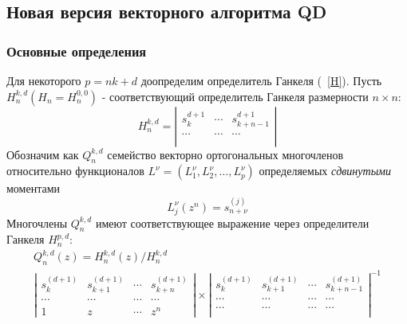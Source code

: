 \subsection{Новая версия векторного алгоритма QD}
\subsubsection{Основные определения}
Для некоторого $p=nk+d$ доопределим  определитель Ганкеля
(~\ref{H}). Пусть $H_n^{k,d} (H_n=H_n^{0,0}) $ - соответствующий
определитель Ганкеля размерности $n \times n$:
$$%
H_n^{k,d}= \left|
\begin{array}{cccccccccccccccccccccc}
s_k^{d+1} & \cdots & s_{k+n-1}^{d+1} \\
\cdots & \cdots & \cdots \\
\end{array}
\right|
$$%
Обозначим как $Q_n^{k,d}$ семейство векторно ортогональных
многочленов относительно функционалов
$L^{\nu}=(L_1^{\nu},L_2^{\nu},\ldots,L_p^{\nu})$ определяемых \emph{
сдвинутыми} моментами
$$ L_j^{\nu}(z^n)=s_{n+\nu}^{(j)}$$
Многочлены $Q_n^{k,d}$ имеют соответствующее выражение через
определители Ганкеля $H_n^{p,d}$:
\begin{equation}
\label{Q_from_H}
\begin{array}{cc}
Q_n^{k,d}(z)=H_n^{k,d}(z)/H_n^{k,d}\\
\left|\begin{array}{ccccc}
s_{k}^{(d+1)} & s_{k+1}^{(d+1)} & \cdots & s_{k+n}^{(d+1)}\\
\cdots & \cdots & \cdots & \cdots\\
1               & z               & \cdots & z^n
\end{array}\right|
\times {\left|\begin{array}{cccc}
s_{k}^{(d+1)} & s_{k+1}^{(d+1)} & \cdots & s_{k+n-1}^{(d+1)}\\
\cdots & \cdots & \cdots & \cdots\\
\cdots & \cdots & \cdots & \cdots\\
\end{array}\right|}^{-1}
\end{array}
\end{equation}

